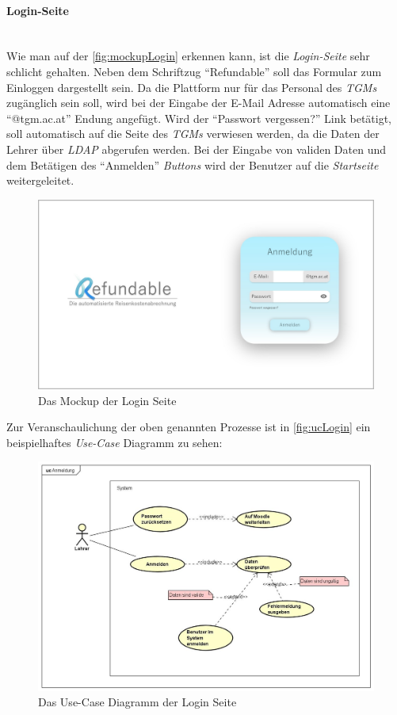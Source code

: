 \paragraph{Login-Seite}
~\\
Wie man auf der \autoref{fig:mockupLogin} erkennen kann, ist die \textit{Login-Seite} sehr schlicht gehalten. Neben dem Schriftzug \enquote{Refundable} soll das Formular zum Einloggen dargestellt sein. Da die Plattform nur für das Personal des \textit{TGMs} zugänglich sein soll, wird bei der Eingabe der E-Mail Adresse automatisch eine \enquote{@tgm.ac.at} Endung angefügt. Wird der \enquote{Passwort vergessen?} Link betätigt, soll automatisch auf die Seite des \textit{TGMs} verwiesen werden, da die Daten der Lehrer über \textit{LDAP} abgerufen werden. Bei der Eingabe von validen Daten und dem Betätigen des \enquote{Anmelden} \textit{Buttons} wird der Benutzer auf die \textit{Startseite} weitergeleitet.
\begin{figure}[H]
	\centering
	\includegraphics[width=1\linewidth]{images/ldehner_konzept/Mockup-Startseite}
	\caption[Mockup Login]{Das Mockup der Login Seite}
	\label{fig:mockupLogin}
\end{figure}
Zur Veranschaulichung der oben genannten Prozesse ist in \autoref{fig:ucLogin} ein beispielhaftes \textit{Use-Case} Diagramm zu sehen: 
\begin{figure}[H]
	\centering
	\includegraphics[width=1\linewidth]{images/ldehner_konzept/uc-login}
	\caption[\textit{Use-Case} Diagramm Login]{Das Use-Case Diagramm der Login Seite}
	\label{fig:ucLogin}
\end{figure}
\newpage
